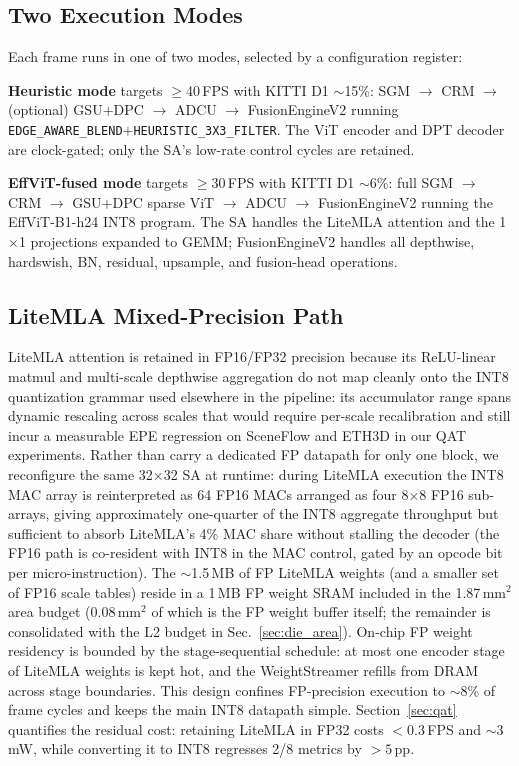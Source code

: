 \documentclass[journal]{IEEEtran}
\begin{document}
\subsection{Two Execution Modes}
Each frame runs in one of two modes, selected by a configuration register:

\textbf{Heuristic mode} targets $\geq$40\,FPS with KITTI D1 $\sim$15\%: SGM $\to$ CRM $\to$ (optional) GSU$+$DPC $\to$ ADCU $\to$ FusionEngineV2 running \texttt{EDGE\_AWARE\_BLEND}$+$\texttt{HEURISTIC\_3X3\_FILTER}. The ViT encoder and DPT decoder are clock-gated; only the SA's low-rate control cycles are retained.

\textbf{EffViT-fused mode} targets $\geq$30\,FPS with KITTI D1 $\sim$6\%: full SGM $\to$ CRM $\to$ GSU$+$DPC sparse ViT $\to$ ADCU $\to$ FusionEngineV2 running the EffViT-B1-h24 INT8 program. The SA handles the LiteMLA attention and the 1$\times$1 projections expanded to GEMM; FusionEngineV2 handles all depthwise, hardswish, BN, residual, upsample, and fusion-head operations.

\subsection{LiteMLA Mixed-Precision Path}
\label{sec:litemla_precision}
LiteMLA attention is retained in FP16/FP32 precision because its ReLU-linear matmul and multi-scale depthwise aggregation do not map cleanly onto the INT8 quantization grammar used elsewhere in the pipeline: its accumulator range spans dynamic rescaling across scales that would require per-scale recalibration and still incur a measurable EPE regression on SceneFlow and ETH3D in our QAT experiments. Rather than carry a dedicated FP datapath for only one block, we reconfigure the same 32$\times$32 SA at runtime: during LiteMLA execution the INT8 MAC array is reinterpreted as 64 FP16 MACs arranged as four 8$\times$8 FP16 sub-arrays, giving approximately one-quarter of the INT8 aggregate throughput but sufficient to absorb LiteMLA's 4\% MAC share without stalling the decoder (the FP16 path is co-resident with INT8 in the MAC control, gated by an opcode bit per micro-instruction). The $\sim$1.5\,MB of FP LiteMLA weights (and a smaller set of FP16 scale tables) reside in a 1\,MB FP weight SRAM included in the 1.87\,mm$^2$ area budget (0.08\,mm$^2$ of which is the FP weight buffer itself; the remainder is consolidated with the L2 budget in Sec.~\ref{sec:die_area}). On-chip FP weight residency is bounded by the stage-sequential schedule: at most one encoder stage of LiteMLA weights is kept hot, and the WeightStreamer refills from DRAM across stage boundaries. This design confines FP-precision execution to $\sim$8\% of frame cycles and keeps the main INT8 datapath simple. Section~\ref{sec:qat} quantifies the residual cost: retaining LiteMLA in FP32 costs $<0.3$\,FPS and $\sim$3\,mW, while converting it to INT8 regresses 2/8 metrics by $>5$\,pp.
\end{document}
